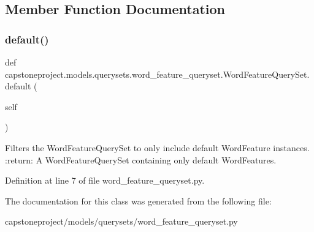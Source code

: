 \subsection{Member Function Documentation}
\mbox{\label{classcapstoneproject_1_1models_1_1querysets_1_1word__feature__queryset_1_1_word_feature_query_set_a529ecccd220e0e2f165e209c30273341}} 
\subsubsection{\texorpdfstring{default()}{default()}}
{\footnotesize\ttfamily def capstoneproject.\+models.\+querysets.\+word\+\_\+feature\+\_\+queryset.\+Word\+Feature\+Query\+Set.\+default (\begin{DoxyParamCaption}\item[{}]{self }\end{DoxyParamCaption})}

\begin{DoxyVerb}Filters the WordFeatureQuerySet to only include default WordFeature
instances.
:return: A WordFeatureQuerySet containing only default WordFeatures.
\end{DoxyVerb}
 

Definition at line 7 of file word\+\_\+feature\+\_\+queryset.\+py.



The documentation for this class was generated from the following file\+:\begin{DoxyCompactItemize}
\item 
capstoneproject/models/querysets/word\+\_\+feature\+\_\+queryset.\+py\end{DoxyCompactItemize}
